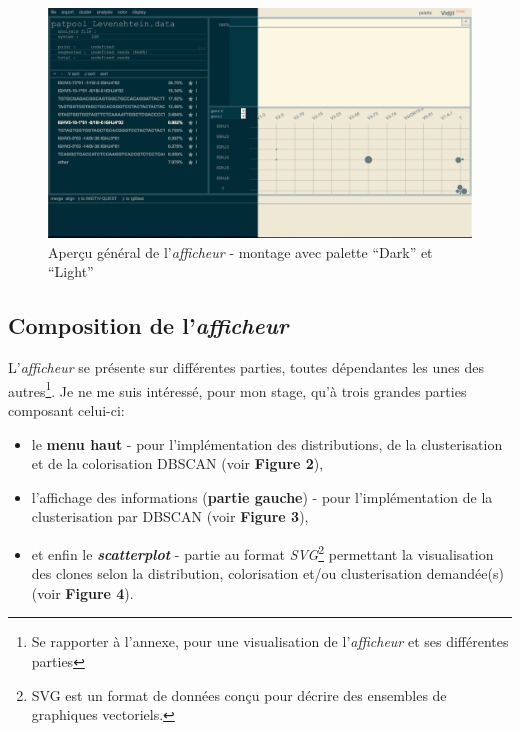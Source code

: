 \documentclass[pdftex,12pt,a4paper]{report}
\begin{document}
\begin{spacing}{1.2}
\begin{figure}[H]
\begin{center}
	\includegraphics[scale=0.35]{img/Montage_Sans_Annotations.jpg}
\end{center}
\caption{Aperçu général de l'\textit{afficheur} - montage avec palette ``Dark'' et ``Light''}
\end{figure}

\subsection{Composition de l'\textit{afficheur}}

L'\textit{afficheur} se présente sur différentes parties, toutes dépendantes les unes des autres\footnote{Se rapporter à l'annexe, pour une visualisation de l'\textit{afficheur} et ses différentes parties}.
\newline Je ne me suis intéressé, pour mon stage, qu'à trois grandes parties composant celui-ci:
\begin{itemize}
\item{le \textbf{menu haut} - pour l'implémentation des distributions, de la clusterisation et de la colorisation DBSCAN (voir \textbf{Figure 2}),}
\item{l'affichage des informations (\textbf{partie gauche}) - pour l'implémentation de la clusterisation par DBSCAN (voir \textbf{Figure 3}),}
\item{et enfin le \textbf{\textit{scatterplot}} - partie au format \textit{SVG}\footnote{SVG est un format de données conçu pour décrire des ensembles de graphiques vectoriels.} permettant la visualisation des clones selon la distribution, colorisation et/ou clusterisation demandée(s) (voir \textbf{Figure 4}).}
\end{itemize}


\end{spacing}
\end{document}
